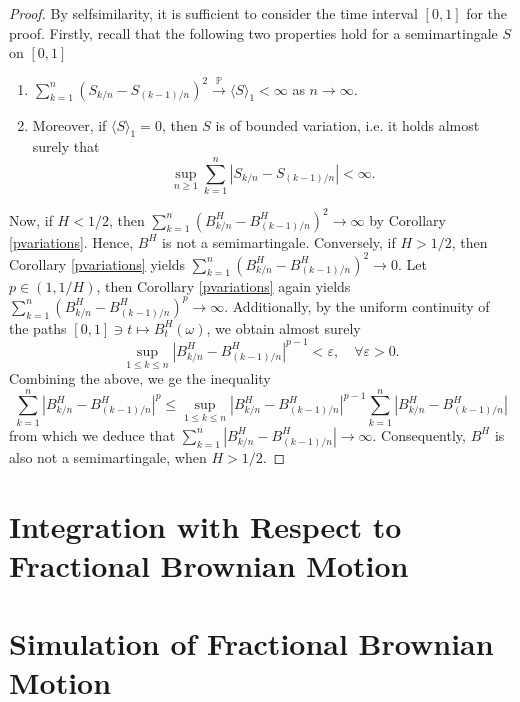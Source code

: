 \begin{proof}
    By selfsimilarity, it is sufficient to consider the time interval $[0,1]$ for the proof. Firstly, recall that the following two properties hold for a semimartingale $S$ on $[0,1]$
    \begin{enumerate}
        \item $\sum_{k=1}^{n}\left(S_{k/n}-S_{(k-1)/n}\right)^{2}\overset{\mathbb{P}}{\to} \langle S\rangle_{1}<\infty$ as $n\to\infty$.
        \item Moreover, if $\langle S\rangle_{1}=0$, then $S$ is of bounded variation, i.e. it holds almost surely that
        \begin{equation}
            \sup_{n\geq 1}\sum_{k=1}^{n}|S_{k/n}-S_{(k-1)/n}|<\infty. 
        \end{equation}
    \end{enumerate}
    Now, if $H<1/2$, then $\sum_{k=1}^{n}(B_{k/n}^{H}-B_{(k-1)/n}^{H})^{2}\to \infty$ by Corollary \ref{pvariations}. Hence, $B^H$ is not a semimartingale. Conversely, if $H>1/2$, then Corollary \ref{pvariations} yields $\sum_{k=1}^{n}(B_{k/n}^{H}-B_{(k-1)/n}^{H})^{2}\to 0$. Let $p\in (1,1/H)$, then Corollary \ref{pvariations} again yields $\sum_{k=1}^{n}(B_{k/n}^{H}-B_{(k-1)/n}^{H})^{p}\to \infty$. Additionally, by the uniform continuity of the paths $[0,1]\ni t\mapsto B_{t}^{H}(\omega)$, we obtain almost surely
    \begin{equation}
        \sup_{1\leq k\leq n}|B_{k/n}^{H}-B_{(k-1)/n}^{H}|^{p-1}<\varepsilon, \quad \forall \varepsilon>0.
    \end{equation}
    Combining the above, we ge the inequality
    \begin{equation}
        \sum_{k=1}^{n}\left|B_{k/n}^{H}-B_{(k-1)/n}^{H}\right|^{p}\leq \sup_{1\leq k\leq n}|B_{k/n}^{H}-B_{(k-1)/n}^{H}|^{p-1}\sum_{k=1}^{n}\left|B_{k/n}^{H}-B_{(k-1)/n}^{H}\right|
    \end{equation}
    from which we deduce that $\sum_{k=1}^{n}|B_{k/n}^{H}-B_{(k-1)/n}^{H}|\to \infty$. Consequently, $B^H$ is also not a semimartingale, when $H>1/2$.
\end{proof}
\section{Integration with Respect to Fractional Brownian Motion}
\section{Simulation of Fractional Brownian Motion}

